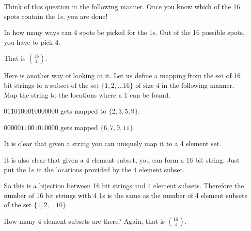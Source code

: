 \documentclass[12pt]{article}
\begin{document}
Think of this question in the following manner. Once you know which of the 16 spots contain the 1s, you are done!

In how many ways can 4 spots be picked for the 1s. Out of the 16 possible spots, you have to pick 4.

That is $\binom{16}{4}$.

Here is another way of looking at it. Let us define a mapping from the set of 16 bit strings to a subset of the set $\{1,2,\ldots 16\}$ of size 4 in the following manner. Map the string to the locations where a 1 can be found.

$0110100010000000$ gets mapped to $\{2,3,5,9\}$.

$0000 0110 0101 0000$ gets mapped $\{6,7,9,11\}$.

It is clear that given a string you can uniquely map it to a 4 element set.

It is also clear that given a 4 element subset, you can form a 16 bit string. Just put the 1s in the locations provided by the 4 element subset.

So this is a bijection between 16 bit strings and 4 element subsets. Therefore the number of 16 bit strings with 4 1s is the same as the number of 4 element subsets of the set $\{1,2,\ldots 16\}$.

How many 4 element subsets are there? Again, that is $\binom{16}{4}$.
\end{document}
